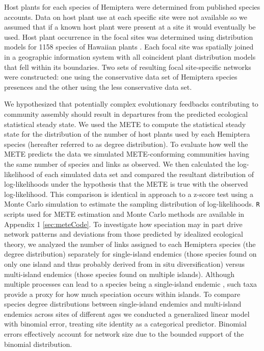 Host plants for each species of Hemiptera were determined from
published species accounts. Data on host plant use at each specific
site were not available so we assumed that if a known host plant were
present at a site it would eventually be used. Host plant occurrence
in the focal sites was determined using distribution models for 1158
species of Hawaiian plants \citep{price2012}. Each focal site was
spatially joined in a geographic information system with all
coincident plant distribution models that fell within its
boundaries. Two sets of resulting focal site-specific networks were
constructed: one using the conservative data set of Hemiptera species
presences and the other using the less conservative data set.

We hypothesized that potentially complex evolutionary feedbacks
contributing to community assembly should result in departures from
the predicted ecological statistical steady state. We used the METE
\citep{williams2010, harte2011} to compute the statistical steady
state for the distribution of the number of host plants used by each
Hemiptera species (hereafter referred to as degree distribution). To
evaluate how well the METE predicts the data we simulated
METE-conforming communities having the same number of species and
links as observed. We then calculated the log-likelihood of each
simulated data set and compared the resultant distribution of
log-likelihoods under the hypothesis that the METE is true with the
observed log-likelihood. This comparison is identical in approach to a
z-score test using a Monte Carlo simulation to estimate the sampling
distribution of log-likelihoods. \texttt{R} scripts
\citep[v.3.1.1;][]{RCore} used for METE estimation and Monte Carlo
methods are available in Appendix 1 \ref{sec:meteCode}.  To investigate how speciation 
may in part drive network patterns and deviations from those predicted
by idealized ecological theory, we analyzed the number of links
assigned to each Hemiptera species (the degree distribution)
separately for single-island endemics (those species found on only one
island and thus probably derived from in situ diversification) versus
multi-island endemics (those species found on multiple
islands). Although multiple processes can lead to a species being a
single-island endemic \citep{whittaker2008}, such taxa provide a proxy
for how much speciation occurs within islands. To compare species
degree distributions between single-island endemics and multi-island
endemics across sites of different ages we conducted a generalized
linear model with binomial error, treating site identity as a
categorical predictor. Binomial errors effectively account for network
size due to the bounded support of the binomial distribution.

